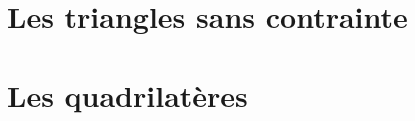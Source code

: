 \documentclass[12pt]{amsart}
\begin{document}





\section{Les triangles sans contrainte}






\section{Les quadrilatères}






%
%
\end{document}
